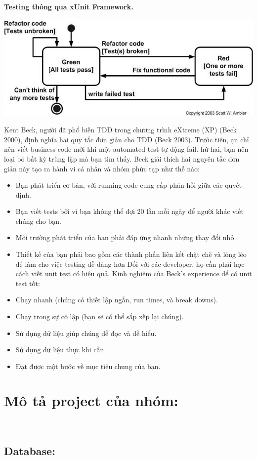 \documentclass[a4paper]{article}
\begin{document}
\textbf{Testing thông qua xUnit Framework.}
\begin{center}
\includegraphics[scale=0.5]{hinh3.jpg}    
\end{center}
Kent Beck, người đã phổ biến TDD trong chương trình eXtreme (XP) (Beck 2000), định nghĩa hai quy tắc đơn giản cho TDD (Beck 2003). Trước tiên, ạn chỉ nên viết business code mới khi một automated test tự động fail. hứ hai, bạn nên loại bỏ bất kỳ trùng lặp mà bạn tìm thấy. Beck giải thích hai nguyên tắc đơn giản này tạo ra hành vi cá nhân và nhóm phức tạp như thế nào:
\begin{itemize}
\item Bạn phát triển cơ bản, với running code cung cấp phản hồi giữa các quyết định.
\item Bạn viết tests bởi vì bạn không thể đợi 20 lần mỗi ngày để người khác viết chúng cho bạn.
\item Môi trường phát triển của bạn phải đáp ứng nhanh những thay đổi nhỏ
\item Thiết kế của bạn phải bao gồm các thành phần liên kết chặt chẽ và lỏng lẻo để làm cho việc testing dễ dàng hơn Đối với các developer, họ cần phải học cách viết unit test có hiệu quả. Kinh nghiệm của Beck’s experience dể có unit test tốt:
\item Chạy nhanh (chúng có thiết lập ngắn, run times, và break downs).
\item Chạy trong sự cô lập (bạn sẽ có thể sắp xếp lại chúng).
\item Sử dụng dữ liệu giúp chúng dễ đọc và dễ hiểu.
\item Sử dụng dữ liệu thực khi cần
\item Đạt được một bước về mục tiêu chung của bạn.
\end{itemize}
\section{Mô tả project của nhóm:}\\
\subsection{Database:}\\
\end{document}
